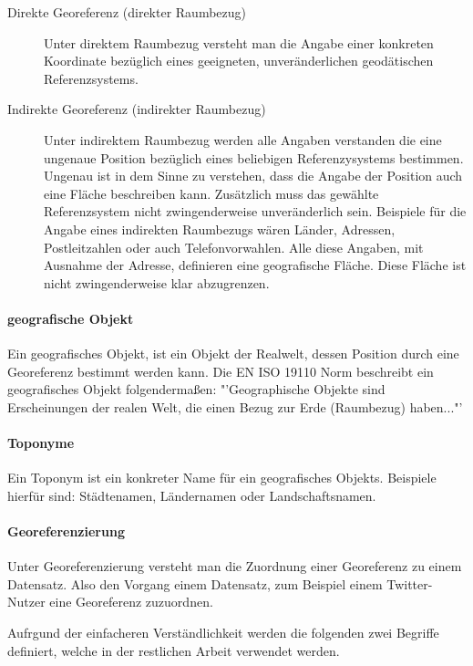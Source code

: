 			\begin{description}
	 			\item[Direkte Georeferenz (direkter Raumbezug)] 
	 			Unter direktem Raumbezug versteht man die Angabe einer konkreten Koordinate bezüglich eines geeigneten, unveränderlichen geodätischen Referenzsystems. 
	 			\item[Indirekte Georeferenz (indirekter Raumbezug) ] 
	 			Unter indirektem Raumbezug werden alle Angaben verstanden die eine ungenaue Position bezüglich eines beliebigen Referenzysystems bestimmen.
	 			Ungenau ist in dem Sinne zu verstehen, dass die Angabe der Position auch eine Fläche beschreiben kann.
	 			Zusätzlich muss das gewählte Referenzsystem nicht zwingenderweise unveränderlich sein.   
	 			Beispiele für die Angabe eines indirekten Raumbezugs wären Länder, Adressen, Postleitzahlen oder auch Telefonvorwahlen. 
	 			Alle diese Angaben, mit Ausnahme der Adresse, definieren eine geografische Fläche. 
	 			Diese Fläche ist nicht zwingenderweise klar abzugrenzen.
			\end{description}

		\paragraph{geografische Objekt}
		Ein geografisches Objekt, ist ein Objekt der Realwelt, dessen Position durch eine Georeferenz bestimmt werden kann. 
		Die EN ISO 19110 Norm beschreibt ein geografisches Objekt folgendermaßen:
		"'Geographische Objekte sind Erscheinungen der realen Welt, die einen Bezug zur Erde (Raumbezug) haben..."'

		\paragraph*{Toponyme}
		Ein Toponym ist ein konkreter Name für ein geografisches Objekts. 
		Beispiele hierfür sind: Städtenamen, Ländernamen oder Landschaftsnamen.  

	 	\paragraph*{Georeferenzierung}
		Unter Georeferenzierung versteht man die Zuordnung einer Georeferenz zu einem Datensatz. 
		Also den Vorgang einem Datensatz, zum Beispiel einem Twitter-Nutzer eine Georeferenz zuzuordnen.  

	 	Aufrgund der einfacheren Verständlichkeit werden die folgenden zwei Begriffe definiert, welche in der restlichen Arbeit verwendet werden.

